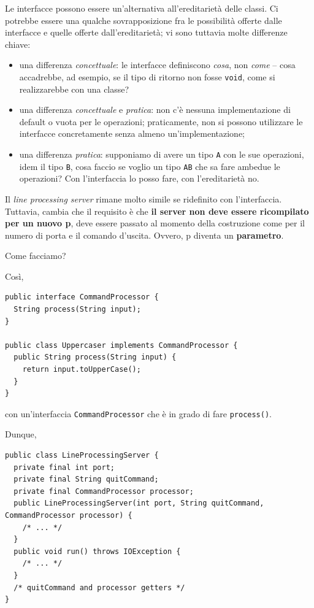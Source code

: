 \documentclass[\fontsizeclass,twocolumn]{\classname}
\theoremstyle{definition}
\theoremstyle{definition}
\begin{document}
Le interfacce possono essere un'alternativa all'ereditarietà delle classi. Ci
potrebbe essere una qualche sovrapposizione fra le possibilità offerte dalle
interfacce e quelle offerte dall'ereditarietà; vi sono tuttavia molte
differenze chiave:
\begin{itemize}
    \item una differenza \emph{concettuale}: le interfacce definiscono
        \emph{cosa}, non \emph{come} -- cosa accadrebbe, ad esempio, se il tipo
        di ritorno non fosse \texttt{void}, come si realizzarebbe con una
        classe?
    \item una differenza \emph{concettuale} e \emph{pratica}: non c'è nessuna
        implementazione di default o vuota per le operazioni; praticamente, non
        si possono utilizzare le interfacce concretamente senza almeno
        un'implementazione;
    \item una differenza \emph{pratica}: supponiamo di avere un tipo \texttt{A}
        con le sue operazioni, idem il tipo \texttt{B}, cosa faccio se voglio
        un tipo \texttt{AB} che sa fare ambedue le operazioni? Con
        l'interfaccia lo posso fare, con l'ereditarietà no.
\end{itemize}

Il \emph{line processing server} rimane molto simile se ridefinito con
l'interfaccia. Tuttavia, cambia che il requisito è che \textbf{il server non
deve essere ricompilato per un nuovo p}, deve essere passato al momento della
costruzione come per il numero di porta e il comando d'uscita. Ovvero, p
diventa un \textbf{parametro}.

Come facciamo?

Così,

\begin{lstlisting}
public interface CommandProcessor {
  String process(String input);
}

public class Uppercaser implements CommandProcessor {
  public String process(String input) {
    return input.toUpperCase();
  }
}
\end{lstlisting}

con un'interfaccia \texttt{CommandProcessor} che è in grado di fare
\texttt{process()}.

Dunque,

\begin{lstlisting}
public class LineProcessingServer {
  private final int port;
  private final String quitCommand;
  private final CommandProcessor processor;
  public LineProcessingServer(int port, String quitCommand, CommandProcessor processor) {
    /* ... */
  }
  public void run() throws IOException {
    /* ... */
  }
  /* quitCommand and processor getters */
}
\end{lstlisting}
\end{document}
